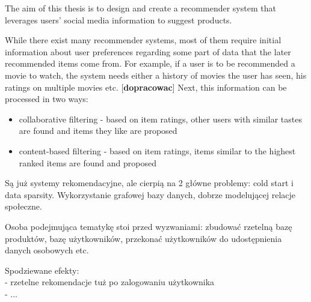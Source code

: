 \documentclass[12pt]{report}
\begin{document}
The aim of this thesis is to design and create a recommender system that leverages users' social media information to suggest products. 

While there exist many recommender systems, most of them require initial information about user preferences regarding some part of data that the later recommended items come from. For example, if a user is to be recommended a movie to watch, the system needs either a history of movies the user has seen, his ratings on multiple movies etc. [{\bf dopracowac}] Next, this information can be processed in two ways:
\begin{itemize}
\item collaborative filtering - based on item ratings, other users with similar tastes are found and items they like are proposed
\item content-based filtering - based on item ratings, items similar to the highest ranked items are found and proposed
\end{itemize}



Są już systemy rekomendacyjne, ale cierpią na 2 główne problemy: cold start i data sparsity. 
Wykorzystanie grafowej bazy danych, dobrze modelującej relacje społeczne.

Osoba podejmująca tematykę stoi przed wyzwaniami: zbudować rzetelną bazę produktów, bazę użytkowników, przekonać użytkowników do udostępnienia danych osobowych etc.

Spodziewane efekty:\\
- rzetelne rekomendacje tuż po zalogowaniu użytkownika\\
- ...\\


\end{document}
